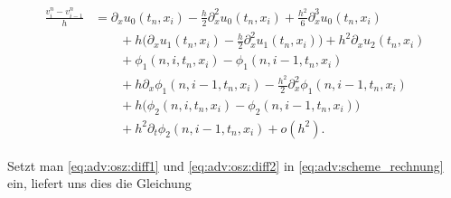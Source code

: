 {\small 
\begin{align} \label{eq:adv:osz:diff2}
\begin{split}
\frac {v^n_i - v^n_{i-1}} h 
&= \partial_x u_0(t_n, x_i) - \frac {h}{2} \partial^2_x u_0(t_n, x_i) + \frac {h^2}{6} \partial^3_x u_0(t_n, x_i)\\
&\qquad + h \bigl( \partial_x u_1(t_n, x_i) - \frac {h}{2} \partial^2_x u_1(t_n, x_i) \bigr) + h^2 \partial_x u_2(t_n, x_i)\\
&\qquad + \phi_1(n, i, t_n, x_i) - \phi_1(n, i-1, t_n, x_i)\\
&\qquad + h \partial_x \phi_1(n, i-1, t_n, x_i) - \frac {h^2}{2} \partial^2_x \phi_1(n, i-1, t_n, x_i)\\
&\qquad + h \bigl( \phi_2(n, i, t_n, x_i) - \phi_2(n, i-1, t_n, x_i) \bigr)\\
&\qquad + h^2 \partial_t \phi_2(n, i-1, t_n, x_i) + o(h^2).
\end{split}
\end{align}
}

Setzt man \eqref{eq:adv:osz:diff1} und \eqref{eq:adv:osz:diff2} in \eqref{eq:adv:scheme_rechnung} ein, liefert uns dies die Gleichung

